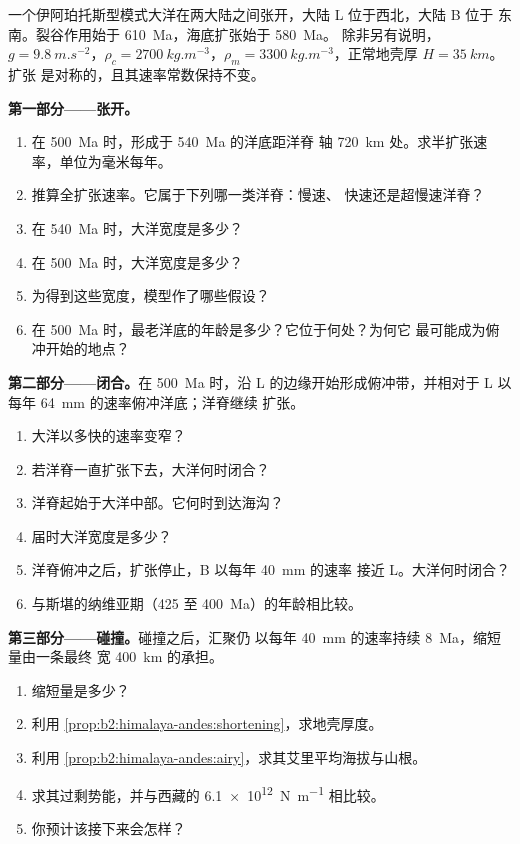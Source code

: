 \begin{problem}\label{pb:b2:wilson-cycle:1}
一个伊阿珀托斯型模式大洋在两大陆之间张开，大陆 L 位于西北，大陆 B 位于
东南。裂谷作用始于 \qty{610}{Ma}，海底扩张始于 \qty{580}{Ma}。
除非另有说明，$g = \qty{9.8}{m.s^{-2}}$，$\rho_c = \qty{2700}{kg.m^{-3}}$，$\rho_m =
\qty{3300}{kg.m^{-3}}$，正常地壳厚 $H = \qty{35}{km}$。扩张
是对称的，且其速率常数保持不变。

\medskip
\noindent\textbf{第一部分——张开。}
\begin{enumerate}
\item 在 \qty{500}{Ma} 时，形成于 \qty{540}{Ma} 的洋底距洋脊
轴 \qty{720}{km} 处。求半扩张速率，单位为毫米每年。
\item 推算全扩张速率。它属于下列哪一类洋脊：慢速、
快速还是超慢速洋脊？
\item 在 \qty{540}{Ma} 时，大洋宽度是多少？
\item 在 \qty{500}{Ma} 时，大洋宽度是多少？
\item 为得到这些宽度，模型作了哪些假设？
\item 在 \qty{500}{Ma} 时，最老洋底的年龄是多少？它位于何处？为何它
最可能成为俯冲开始的地点？
\end{enumerate}

\noindent\textbf{第二部分——闭合。}在 \qty{500}{Ma} 时，沿
L 的边缘开始形成俯冲带，并相对于 L 以每年 \qty{64}{mm} 的速率俯冲洋底；洋脊继续
扩张。
\begin{enumerate}[resume]
\item 大洋以多快的速率变窄？
\item 若洋脊一直扩张下去，大洋何时闭合？
\item 洋脊起始于大洋中部。它何时到达海沟？
\item 届时大洋宽度是多少？
\item 洋脊俯冲之后，扩张停止，B 以每年 \qty{40}{mm} 的速率
接近 L。大洋何时闭合？
\item 与斯堪的纳维亚期（425 至 \qty{400}{Ma}）的年龄相比较。
\end{enumerate}

\noindent\textbf{第三部分——碰撞。}碰撞之后，汇聚仍
以每年 \qty{40}{mm} 的速率持续 \qty{8}{Ma}，缩短量由一条最终
宽 \qty{400}{km} 的承担。
\begin{enumerate}[resume]
\item 缩短量是多少？
\item 利用 \cref{prop:b2:himalaya-andes:shortening}，求地壳厚度。
\item 利用 \cref{prop:b2:himalaya-andes:airy}，求其艾里平均海拔与山根。
\item 求其过剩势能，并与西藏的
\qty{6.1e12}{N.m^{-1}} 相比较。
\item 你预计该接下来会怎样？
\end{enumerate}


\end{problem}
